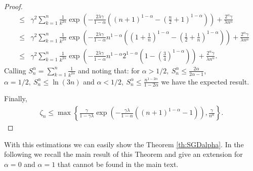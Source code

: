 \begin{proof}
\begin{eqnarray*}
 &\leqslant& \gamma^2\sum_{k=1}^n  \frac{1}{k^{2\alpha}} \exp\left( -\frac{2 \lambda\gamma}{1-\alpha} \left( \left(n+1\right)^{1-\alpha}-\left(\frac{n}{2}+1\right)^{1-\alpha} \right) \right) +  \frac{2^\alpha\gamma}{\lambda n^\alpha} \\
  &\leqslant& \gamma^2\sum_{k=1}^n  \frac{1}{k^{2\alpha}} \exp\left( -\frac{2 \lambda\gamma}{1-\alpha} n^{1-\alpha} \left( \left(1+\frac{1}{n}\right)^{1-\alpha}-\left(\frac{1}{2}+\frac{1}{n}\right)^{1-\alpha} \right) \right) +  \frac{2^\alpha\gamma}{\lambda n^\alpha} \\
  &\leqslant& \gamma^2\sum_{k=1}^n  \frac{1}{k^{2\alpha}} \exp\left( -\frac{2 \lambda\gamma}{1-\alpha} n^{1-\alpha} 2^{1-\alpha}\left( 1-\left(\frac{3}{4}\right)^{1-\alpha} \right)\right) +  \frac{2^\alpha\gamma}{\lambda n^\alpha} .
\end{eqnarray*}
Calling $S_n^\alpha = \sum_{k=1}^n \frac{1}{k^{2\alpha}}$ and noting that: for $\alpha > 1/2,\ S_n^\alpha \leqslant \frac{2\alpha}{2\alpha - 1}$, $\alpha = 1/2,\ S_n^\alpha \leqslant \ln(3n)$ and $\alpha < 1/2,\ S_n^\alpha \leqslant \frac{n^{1-2\alpha}}{1 - 2\alpha }$ we have the expected result.

Finally,
\begin{eqnarray*}
\zeta_n \leqslant \max \left\{\frac{\gamma}{1-\gamma\lambda}\exp\left(  -\frac{\gamma\lambda}{1-\alpha}\left( (n+1)^{1-\alpha} -1  \right)   \right), \frac{\gamma}{n^\alpha} \right\}.
\end{eqnarray*}
\EIT

\end{proof}

With this estimations we can easily show the Theorem \ref{th:SGDalpha}. In the following we recall the main result of this Theorem and give an extension for $\alpha = 0$ and $\alpha = 1$ that cannot be found in the main text.

